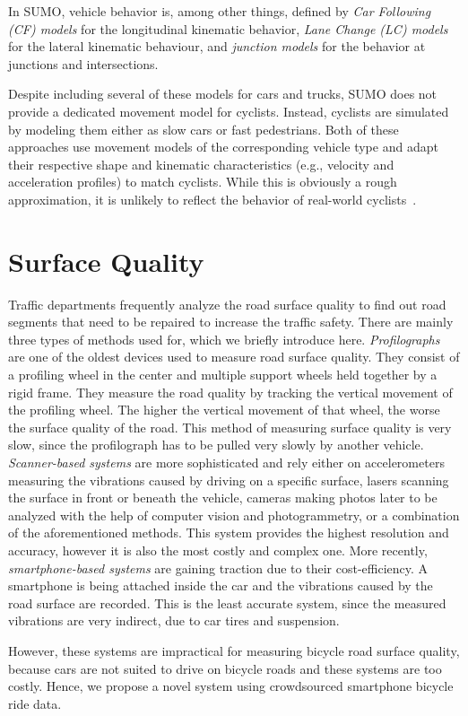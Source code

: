 In SUMO, vehicle behavior is, among other things, defined by
\textit{Car Following (CF) models} for the longitudinal kinematic behavior,
\textit{Lane Change (LC) models} for the lateral kinematic behaviour,
and \textit{junction models} for the behavior at junctions and intersections.

Despite including several of these models for cars and trucks, SUMO does not provide a dedicated movement model for cyclists.
Instead, cyclists are simulated by modeling them either as slow cars or fast pedestrians.
Both of these approaches use movement models of the corresponding vehicle type and adapt their respective shape and kinematic characteristics (e.g., velocity and acceleration profiles) to match cyclists.
While this is obviously a rough approximation, it is unlikely to reflect the behavior of real-world cyclists~\cite{grigoropoulos2019modelling}.

\section{Surface Quality}
\label{sec:surface_quality_background}
Traffic departments frequently analyze the road surface quality to find out road segments that need to be repaired to increase the traffic safety.
There are mainly three types of methods used for, which we briefly introduce here.
\textit{Profilographs} are one of the oldest devices used to measure road surface quality.
They consist of a profiling wheel in the center and multiple support wheels held together by a rigid frame.
They measure the road quality by tracking the vertical movement of the profiling wheel.
The higher the vertical movement of that wheel, the worse the surface quality of the road.
This method of measuring surface quality is very slow, since the profilograph has to be pulled very slowly by another vehicle.
\textit{Scanner-based systems} are more sophisticated and rely either on accelerometers measuring the vibrations caused by driving on a specific surface, lasers scanning the surface in front or beneath the vehicle, cameras making photos later to be analyzed with the help of computer vision and photogrammetry, or a combination of the aforementioned methods.
This system provides the highest resolution and accuracy, however it is also the most costly and complex one.
More recently, \textit{smartphone-based systems} are gaining traction due to their cost-efficiency.
A smartphone is being attached inside the car and the vibrations caused by the road surface are recorded.
This is the least accurate system, since the measured vibrations are very indirect, due to car tires and suspension.

However, these systems are impractical for measuring bicycle road surface quality, because cars are not suited to drive on bicycle roads and these systems are too costly.
Hence, we propose a novel system using crowdsourced smartphone bicycle ride data.

